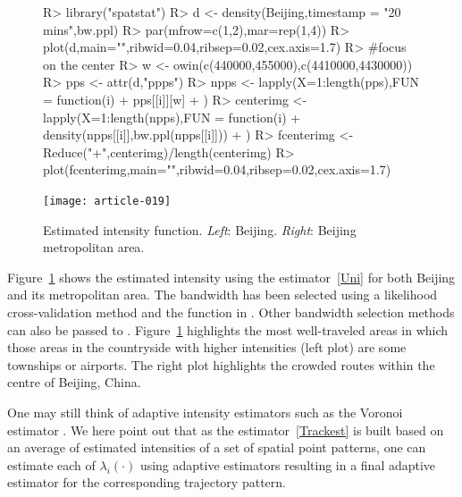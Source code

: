 \documentclass[article]{jss}
\begin{document}
\begin{figure}[!h]
\begin{center}
\begin{Sinput}
R>  library("spatstat")
R>  d <- density(Beijing,timestamp = "20 mins",bw.ppl)
R>  par(mfrow=c(1,2),mar=rep(1,4))
R>  plot(d,main="",ribwid=0.04,ribsep=0.02,cex.axis=1.7)
R>  #focus on the center
R>  w <- owin(c(440000,455000),c(4410000,4430000))
R>  pps <- attr(d,"ppps")
R>  npps <- lapply(X=1:length(pps),FUN = function(i){
+     pps[[i]][w]
+   })
R>  centerimg <- lapply(X=1:length(npps),FUN = function(i){
+     density(npps[[i]],bw.ppl(npps[[i]]))
+   })
R>  fcenterimg <- Reduce("+",centerimg)/length(centerimg)
R>  plot(fcenterimg,main="",ribwid=0.04,ribsep=0.02,cex.axis=1.7)
\end{Sinput}
\texttt{[image: article-019]}
\end{center}
\caption{Estimated intensity function. \emph{Left}: Beijing. \emph{Right}: Beijing metropolitan area.}
\label{bijingint}
\end{figure}

Figure~\ref{bijingint} shows the estimated intensity using the estimator~\ref{Uni} for both Beijing and its metropolitan area. The bandwidth has been selected using a likelihood cross-validation method and the function  in . Other bandwidth selection methods can also be passed to . Figure~\ref{bijingint} highlights the most well-traveled areas in which those areas in the countryside with higher intensities (left plot) are some townships or airports. The right plot highlights the crowded routes within the centre of Beijing, China.

One may still think of adaptive intensity estimators such as the Voronoi estimator \citep{Ord78,BSV10}. We here point out that as the estimator~\ref{Trackest} is built based on an average of estimated intensities of a set of spatial point patterns, one can estimate each of $\lambda_i(\cdot)$ using adaptive estimators resulting in a final adaptive estimator for the corresponding trajectory pattern.
\end{document}
